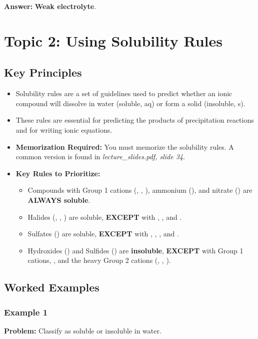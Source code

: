 \documentclass{article}
\begin{document}
\textbf{Answer:} \textbf{Weak electrolyte}.

\section{Topic 2: Using Solubility Rules}
\subsection{Key Principles}
\begin{itemize}
    \item Solubility rules are a set of guidelines used to predict whether an ionic compound will dissolve in water (soluble, aq) or form a solid (insoluble, s).
    \item These rules are essential for predicting the products of precipitation reactions and for writing ionic equations.
    \item \textbf{Memorization Required:} You must memorize the solubility rules. A common version is found in \textit{lecture\_slides.pdf, slide 34}.
    \item \textbf{Key Rules to Prioritize:}
        \begin{itemize}
            \item Compounds with Group 1 cations (, , ), ammonium (), and nitrate () are \textbf{ALWAYS soluble}.
            \item Halides (, , ) are soluble, \textbf{EXCEPT} with , , and .
            \item Sulfates () are soluble, \textbf{EXCEPT} with , , , and .
            \item Hydroxides () and Sulfides () are \textbf{insoluble}, \textbf{EXCEPT} with Group 1 cations, , and the heavy Group 2 cations (, , ).
        \end{itemize}
\end{itemize}

\subsection{Worked Examples}
\subsubsection{Example 1}
\textbf{Problem:} Classify  as soluble or insoluble in water.
\end{document}
